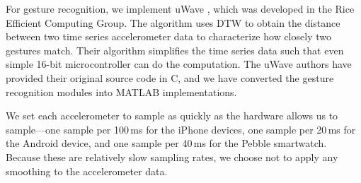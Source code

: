For gesture recognition, we implement uWave \cite{Liu:2009, LiuuWave}, which was developed in the Rice Efficient Computing Group. The algorithm uses \gls{DTW} to obtain the distance between two time series accelerometer data to characterize how closely two gestures match. Their algorithm simplifies the time series data such that even simple 16-bit microcontroller can do the computation. The uWave authors have provided their original source code in C, and we have converted the gesture recognition modules into MATLAB implementations. 

We set each accelerometer to sample as quickly as the hardware allows us to sample---one sample per 100\,ms for the iPhone devices, one sample per 20\,ms for the Android device, and one sample per 40\,ms for the Pebble smartwatch. Because these are relatively slow sampling rates, we choose not to apply any smoothing to the accelerometer data. 

